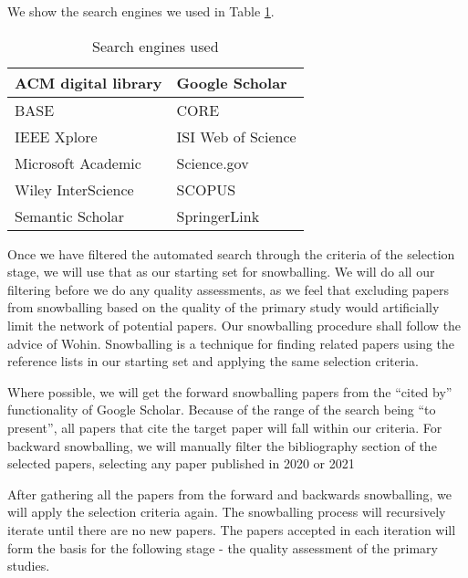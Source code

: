 We show the search engines we used in Table \ref{table:searchEngines}.

\begin{table}[h]
    \begin{center}         
        \begin{tabular}{|l||l|}
            \hline
            ACM digital library       & Google Scholar       \\
            \hline
            BASE                      & CORE                 \\
            \hline  
            IEEE Xplore               & ISI Web of Science   \\
            \hline  
            Microsoft Academic        & Science.gov          \\
            \hline  
            Wiley InterScience        & SCOPUS               \\
            \hline  
            Semantic Scholar          & SpringerLink         \\
            \hline  
        \end{tabular}
    \end{center}
    \caption{Search engines used}
    \label{table:searchEngines}
\end{table}

Once we have filtered the automated search through the criteria of the selection stage, we will use that as our starting set for snowballing.
We will do all our filtering before we do any quality assessments, as we feel that excluding papers from snowballing based on the quality of the primary study would artificially limit the network of potential papers.
Our snowballing procedure shall follow the advice of Wohin\cite{Wohlin_2014}.
Snowballing is a technique for finding related papers using the reference lists in our starting set and applying the same selection criteria.

Where possible, we will get the forward snowballing papers from the ``cited by'' functionality of Google Scholar.
Because of the range of the search being ``to present'', all papers that cite the target paper will fall within our criteria.
For backward snowballing, we will manually filter the bibliography section of the selected papers, selecting any paper published in 2020 or 2021

After gathering all the papers from the forward and backwards snowballing, we will apply the selection criteria again.
The snowballing process will recursively iterate until there are no new papers.
The papers accepted in each iteration will form the basis for the following stage - the quality assessment of the primary studies.

